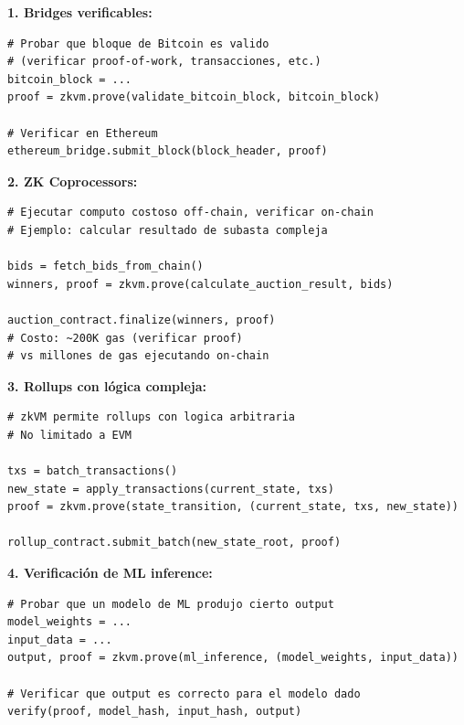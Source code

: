 \documentclass[11pt,a4paper,twoside]{book}
\begin{document}
\begin{example}
\textbf{1. Bridges verificables:}
\begin{lstlisting}[style=python]
# Probar que bloque de Bitcoin es valido
# (verificar proof-of-work, transacciones, etc.)
bitcoin_block = ...
proof = zkvm.prove(validate_bitcoin_block, bitcoin_block)

# Verificar en Ethereum
ethereum_bridge.submit_block(block_header, proof)
\end{lstlisting}

\textbf{2. ZK Coprocessors:}
\begin{lstlisting}[style=python]
# Ejecutar computo costoso off-chain, verificar on-chain
# Ejemplo: calcular resultado de subasta compleja

bids = fetch_bids_from_chain()
winners, proof = zkvm.prove(calculate_auction_result, bids)

auction_contract.finalize(winners, proof)
# Costo: ~200K gas (verificar proof)
# vs millones de gas ejecutando on-chain
\end{lstlisting}

\textbf{3. Rollups con l\'ogica compleja:}
\begin{lstlisting}[style=python]
# zkVM permite rollups con logica arbitraria
# No limitado a EVM

txs = batch_transactions()
new_state = apply_transactions(current_state, txs)
proof = zkvm.prove(state_transition, (current_state, txs, new_state))

rollup_contract.submit_batch(new_state_root, proof)
\end{lstlisting}

\textbf{4. Verificaci\'on de ML inference:}
\begin{lstlisting}[style=python]
# Probar que un modelo de ML produjo cierto output
model_weights = ...
input_data = ...
output, proof = zkvm.prove(ml_inference, (model_weights, input_data))

# Verificar que output es correcto para el modelo dado
verify(proof, model_hash, input_hash, output)
\end{lstlisting}
\end{example}
\end{document}
